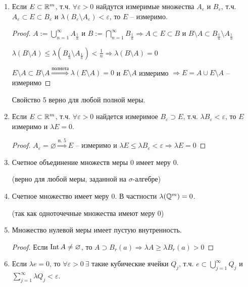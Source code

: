 \begin{enumerate}
    \item Если $E\subset \mathbb{R}^m$, т.ч. $\forall \varepsilon > 0$ найдутся измеримые множества
    $A_\varepsilon$ и $B_\varepsilon$, т.ч. $A_\varepsilon\subset E \subset B_\varepsilon$ и 
    $\lambda (B_\varepsilon\setminus A_\varepsilon)< \varepsilon$, то $E$ – измеримо.
    
    \begin{proof}
        $A:=\bigcup\limits_{n=1}^\infty A_{\frac{1}{n}}$ и $B:=\bigcap\limits_{n=1}^\infty B_{\frac{1}{n}}\Rightarrow
        A\subset E \subset B$ и $B\setminus A \subset B_{\frac{1}{n}}\setminus A_{\frac{1}{n}}$

        $\lambda (B\setminus A)\leq \lambda (B_{\frac{1}{n}}\setminus A_{\frac{1}{n}})<\frac{1}{n}\Rightarrow \lambda (B\setminus A) = 0$

        $E\setminus A\subset B\setminus A\overset{\text{полнота}}{\Rightarrow} \lambda (E\setminus A)=0$ и $E\setminus A$ измеримо
        $\Rightarrow E= A\cup E\setminus A$ – измеримо
    \end{proof}

    \begin{remark}
        Свойство 5 верно для любой полной меры.
    \end{remark}

    \item Если $E\subset \mathbb{R}^m$, т.ч. $\forall \varepsilon > 0$ найдется измеримое
    $B_\varepsilon\supset E$, т.ч. $\lambda B_\varepsilon< \varepsilon$, то $E$ измеримо и $\lambda E = 0$.

    \begin{proof}
        $A_\varepsilon = \varnothing\overset{\text{п. 5}}{\Rightarrow} E$ – измеримо и $\lambda E\leq \lambda B_\varepsilon < \varepsilon
        \Rightarrow \lambda E = 0$
    \end{proof}

    \item Счетное объединение множеств меры 0 имеет меру 0.
    
    (верно для любой меры, заданной на $\sigma$-алгебре)
    \item Счетное множество имеет меру 0. В частности $\lambda (\mathbb{Q}^m)=0$.
    
    (так как одноточечные множества имеют меру 0)
    \item Множество нулевой меры имеет пустую внутренность.
    
    \begin{proof}
        Если $\operatorname{Int} A\not = \varnothing$, то $A\supset B_r (a)\Rightarrow \lambda A \geq \lambda B_r(a)>0$
    \end{proof}
    \item Если $\lambda e = 0$, то $\forall \varepsilon > 0\ \exists$ такие кубические ячейки $Q_j$, 
    т.ч. $e\subset \bigcup\limits_{j=1}^\infty Q_j$ и $\sum\limits_{j=1}^\infty \lambda Q_j< \varepsilon$.


\end{enumerate}

